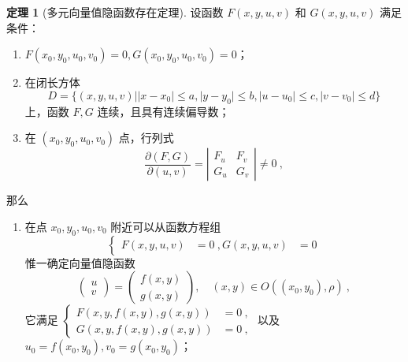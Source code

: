 \documentclass[zihao=-4,linespread=1.8,UTF8,nothm]{aytony_base}
\theoremstyle{definition}
\newtheorem{theorem}{\indent\heiti\textbf{定理}}[subsection]
\begin{document}
\begin{theorem}[多元向量值隐函数存在定理]
    设函数 $F(x, y, u, v)$ 和 $G(x, y, u, v)$ 满足条件：

    \begin{enumerate}[nosep]
        \item $F(x_0, y_0, u_0, v_0) = 0, G(x_0, y_0, u_0, v_0) = 0$；
        \item 在闭长方体 $$
                  D = \{(x, y, u, v) | |x - x_0| \leqslant a, |y - y_0| \leqslant b, |u - u_0| \leqslant c, |v - v_0| \leqslant d\}
              $$ 上，函数 $F, G$ 连续，且具有连续偏导数；
        \item 在 $(x_0, y_0, u_0, v_0)$ 点，行列式 $$
                  \dfrac{\partial(F, G)}{\partial(u, v)} = \left|
                  \begin{matrix}
                      F_u & F_v \\
                      G_u & G_v
                  \end{matrix}
                  \right| \neq 0\ ,
              $$
    \end{enumerate}
    那么
    \begin{enumerate}[nosep]
        \item 在点 $x_0, y_0, u_0, v_0$ 附近可以从函数方程组 $$
                  \left\{
                  \begin{aligned}
                      F(x, y, u, v) & = 0\ ,
                      G(x, y, u, v) & = 0
                  \end{aligned}
                  \right.
              $$ 惟一确定向量值隐函数 $$
                  \left(
                  \begin{matrix}
                          u \\v
                      \end{matrix}
                  \right) = \left(
                  \begin{matrix}
                          f(x, y) \\g(x, y)
                      \end{matrix}
                  \right),\quad (x, y) \in O((x_0, y_0), \rho)\ ,
              $$ 它满足 $\left\{
                  \begin{aligned}
                      F(x, y, f(x, y), g(x, y)) & = 0\ , \\
                      G(x, y, f(x, y), g(x, y)) & = 0\ ,
                  \end{aligned}
                  \right.$ 以及 $u_0 = f(x_0, y_0), v_0 = g(x_0, y_0)$；

\end{enumerate}
\end{theorem}
\end{document}
